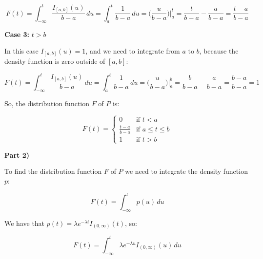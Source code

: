 \begin{equation}
    F(t) = \int_{-\infty}^{t} \frac{I_{[a,b]}(u)}{b-a} \, du = \int_{a}^{t} \frac{1}{b-a} \, du = \Big(\frac{u}{b-a} \Big)\Big|_{a}^{t} = \frac{t}{b-a} - \frac{a}{b-a} = \frac{t - a}{b-a}
\end{equation}

\singlespacing

\textbf{Case 3:} $t > b$

\singlespacing

In this case $I_{[a,b]}(u) = 1$, and we need to integrate from $a$ to $b$,
because the density function is zero outside of $[a, b]$:

\singlespacing

\begin{equation}
    F(t) = \int_{-\infty}^{t} \frac{I_{[a,b]}(u)}{b-a} \, du = \int_{a}^{b} \frac{1}{b-a} \, du = \Big(\frac{u}{b-a} \Big)\Big|_{a}^{b} = \frac{b}{b-a} - \frac{a}{b-a} = \frac{b - a}{b-a} = 1
\end{equation}

\singlespacing

So, the distribution function $F$ of $P$ is:

\singlespacing

\begin{equation}
    F(t) = \begin{cases}
        0                 & \text{if } t < a           \\
        \frac{t - a}{b-a} & \text{if } a \leq t \leq b \\
        1                 & \text{if } t > b
    \end{cases}
\end{equation}

\singlespacing

\textbf{Part 2)}

\singlespacing

To find the distribution function $F$ of $P$ we need to integrate the density function $p$:

\singlespacing

\begin{equation}
    F(t) = \int_{-\infty}^{t} p(u) \, du
\end{equation}

\singlespacing

We have that $p(t) = \lambda e^{-\lambda t}I_{(0,\infty)}(t)$, so:

\singlespacing

\begin{equation}
    F(t) = \int_{-\infty}^{t} \lambda e^{-\lambda u}I_{(0,\infty)}(u) \, du
\end{equation}


